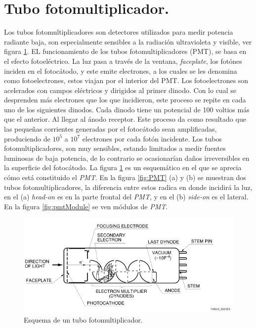 \section{Tubo fotomultiplicador.}
Los tubos fotomultiplicadores son detectores utilizados para medir potencia radiante baja, son especialmente sensibles a la radiación ultravioleta y visible, ver figura \ref{fig:pmte}. EL funcionamiento de los tubos fotomultiplicadores (PMT), se basa en el efecto fotoeléctrico.  
La luz pasa a través de la ventana, \textit{faceplate}, los fotónes inciden en el fotocátodo, y este emite electrones, a los cuales se les denomina como fotoelectrones, estos viajan por el interior del PMT.  Los fotoelectrones son acelerados con campos eléctricos y dirigidos al primer dinodo. Con lo cual se desprenden más electrones que los que incidieron, este proceso se repite en cada uno de los siguientes dinodos. Cada dinodo tiene un potencial de 100 voltios más que el anterior. Al llegar al ánodo receptor. Este proceso da como resultado que las pequeñas corrientes generadas por el fotocátodo sean amplificadas, produciendo de $10^5$ a $10^7$ electrones por cada fotón incidente.
Los tubos fotomultiplicadores, son muy sensibles, estando limitados a medir fuentes luminosas de baja potencia, de lo contrario se ocasionarían daños irreversibles en la superficie del fotocátodo.
La figura \ref{fig:pmte} es un esquemático en el que se aprecia cómo está constituido el \textit{PMT}. En la figura \ref{fig:PMT} (a) y (b) se muestran dos tubos fotomultiplicadores, la diferencia entre estos radica en donde incidirá la luz, en el (a) \textit{head-on} es en la parte frontal del \textit{PMT}, y en el (b) \textit{side-on} es el lateral. En la figura \ref{fig:pmtModule} se ven módulos de \textit{PMT}. 
 
 \begin{figure}
	\centering
	\includegraphics[width=0.9\linewidth]{Imagenes/2/PMT}
	\caption[Esquema de un tubo fotomultiplicador.]{Esquema de un tubo fotomultiplicador.\cite{Hamamatsu2006}}
	\label{fig:pmte}
\end{figure}

